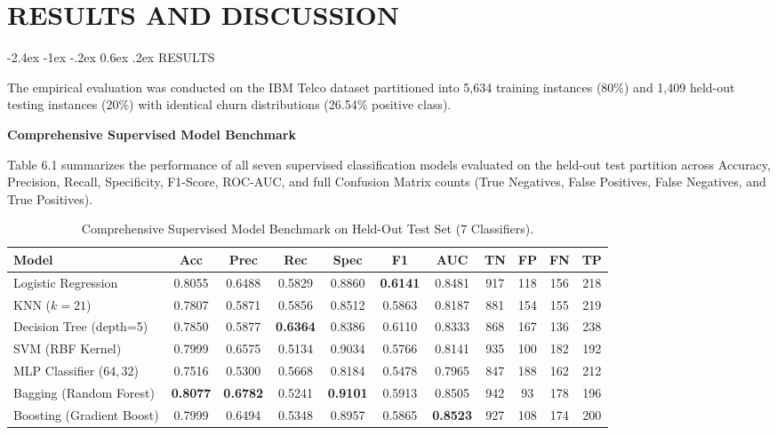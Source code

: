 \documentclass[12pt,oneside]{report}
\makeatletter
\renewcommand{\section}{\@startsection{section}{1}{\z@}%
  {-2.4ex \@plus -1ex \@minus -.2ex}%
  {0.6ex \@plus .2ex}%
  {\normalfont\large\bfseries}}
\newcommand{\chapterpage}[1]{\chapter{#1}}
\makeatother
\begin{document}
\clearpage

\chapterpage{RESULTS AND DISCUSSION}
\section{RESULTS}

The empirical evaluation was conducted on the IBM Telco dataset partitioned into 5,634 training instances (80\%) and 1,409 held-out testing instances (20\%) with identical churn distributions (26.54\% positive class).

\textbf{Comprehensive Supervised Model Benchmark}

Table 6.1 summarizes the performance of all seven supervised classification models evaluated on the held-out test partition across Accuracy, Precision, Recall, Specificity, F1-Score, ROC-AUC, and full Confusion Matrix counts (True Negatives, False Positives, False Negatives, and True Positives).

\begin{table}[H]
\centering
\small
\caption{Comprehensive Supervised Model Benchmark on Held-Out Test Set (7 Classifiers).}
\label{tab:6.1}
\vspace{0.05in}
\begin{tabular}{lcccccc cccc}
\toprule
\textbf{Model} & \textbf{Acc} & \textbf{Prec} & \textbf{Rec} & \textbf{Spec} & \textbf{F1} & \textbf{AUC} & \textbf{TN} & \textbf{FP} & \textbf{FN} & \textbf{TP} \\
\midrule
Logistic Regression       & 0.8055 & 0.6488 & 0.5829 & 0.8860 & \textbf{0.6141} & 0.8481 & 917 & 118 & 156 & 218 \\
KNN ($k=21$)              & 0.7807 & 0.5871 & 0.5856 & 0.8512 & 0.5863 & 0.8187 & 881 & 154 & 155 & 219 \\
Decision Tree (depth=5)   & 0.7850 & 0.5877 & \textbf{0.6364} & 0.8386 & 0.6110 & 0.8333 & 868 & 167 & 136 & 238 \\
SVM (RBF Kernel)          & 0.7999 & 0.6575 & 0.5134 & 0.9034 & 0.5766 & 0.8141 & 935 & 100 & 182 & 192 \\
MLP Classifier ($64, 32$) & 0.7516 & 0.5300 & 0.5668 & 0.8184 & 0.5478 & 0.7965 & 847 & 188 & 162 & 212 \\
Bagging (Random Forest)   & \textbf{0.8077} & \textbf{0.6782} & 0.5241 & \textbf{0.9101} & 0.5913 & 0.8505 & 942 & 93  & 178 & 196 \\
Boosting (Gradient Boost) & 0.7999 & 0.6494 & 0.5348 & 0.8957 & 0.5865 & \textbf{0.8523} & 927 & 108 & 174 & 200 \\
\bottomrule
\end{tabular}
\end{table}
\end{document}
